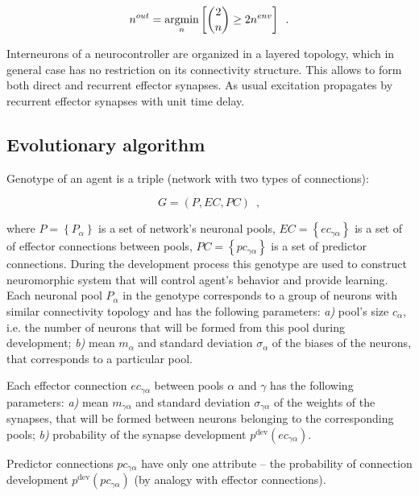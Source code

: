 \documentclass[letterpaper]{article}
\begin{document}
\begin{equation}
	n^{out}=\underset{n}{\operatorname{argmin}} \left[\dbinom{2}{n}\geq2n^{env}\right] \enspace . 
\end{equation}   

Interneurons of a neurocontroller are organized in a layered topology, which in general case has no restriction on its connectivity structure. This allows to form both direct and recurrent effector synapses. As usual excitation propagates by recurrent effector synapses with unit time delay.

\subsection{Evolutionary algorithm}

Genotype of an agent is a triple (network with two types of connections):

\begin{equation}
	G = \left( P, EC, PC\right)\enspace , 
\end{equation} 

\noindent where $P = \left\{P_{\alpha}\right\}$ is a set of network's neuronal pools, $EC = \left\{ec_{\gamma\alpha}\right\}$ is a set of of effector connections between pools, $PC = \left\{pc_{\gamma\alpha}\right\}$ is a set of predictor connections. During the development process this genotype are used to construct neuromorphic system that will control agent's behavior and provide learning. Each neuronal pool $P_{\alpha}$ in the genotype corresponds to a group of neurons with similar connectivity topology and has the following parameters: {\em a)} pool's size $c_{\alpha}$, i.e. the number of neurons that will be formed from this pool during development; {\em b)} mean $m_{\alpha}$ and standard deviation $\sigma_{\alpha}$ of the biases of the neurons, that corresponds to a particular pool.

Each effector connection $ec_{\gamma\alpha}$ between pools $\alpha$ and $\gamma$ has the following parameters:  {\em a)} mean $m_{\gamma\alpha}$ and standard deviation $\sigma_{\gamma\alpha}$ of the weights of the synapses, that will be formed between neurons belonging to the corresponding pools; {\em b)} probability of the synapse development $p^{\mathrm{dev}}\left(ec_{\gamma\alpha}\right)$.

Predictor connections $pc_{\gamma\alpha}$ have only one attribute -- the probability of connection development $p^{\mathrm{dev}}\left(pc_{\gamma\alpha}\right)$ (by analogy with effector connections).
\end{document}
